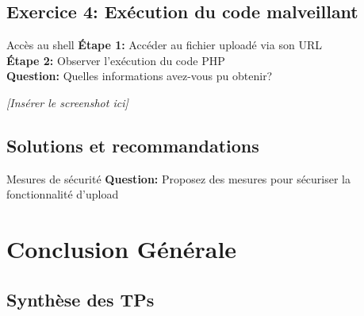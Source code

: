 \documentclass[12pt,a4paper]{article}
\begin{document}
\subsection{Exercice 4: Exécution du code malveillant}

\begin{exercicebox}{Accès au shell}
\textbf{Étape 1:} Accéder au fichier uploadé via son URL\\
\textbf{Étape 2:} Observer l'exécution du code PHP\\
\textbf{Question:} Quelles informations avez-vous pu obtenir?
\end{exercicebox}

\begin{answerbox}
\vspace{7cm}
\end{answerbox}

\begin{screenshotbox}
\centering
\textit{[Insérer le screenshot ici]}
\end{screenshotbox}

\subsection{Solutions et recommandations}

\begin{exercicebox}{Mesures de sécurité}
\textbf{Question:} Proposez des mesures pour sécuriser la fonctionnalité d'upload
\end{exercicebox}

\begin{answerbox}
\vspace{7cm}
\end{answerbox}

\newpage

\section{Conclusion Générale}

\subsection{Synthèse des TPs}

\begin{answerbox}
\vspace{10cm}
\end{answerbox}
\end{document}
